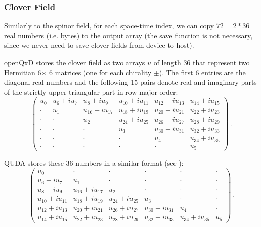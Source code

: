 \subsubsection{Clover Field}

Similarly to the spinor field, for each space-time index, we can copy $72 = 2*36$ real numbers (i.e.  bytes)
to the output array  (the save function is not necessary, since we never need to save clover fields from device to host).

openQxD stores the clover field as two arrays $u$ of length $36$ that represent two Hermitian 6$\times$ 6 matrices (one for each chirality $\pm$). The first $6$ entries are the diagonal real numbers and the following 15 pairs denote real and imaginary parts of the strictly upper triangular part in row-major order:
\newlength{\oldcolsep}
\setlength{\oldcolsep}{\arraycolsep}
\setlength{\arraycolsep}{4pt}
\begin{equation}
\begin{pmatrix}
u_0   & u_6 + iu_7 & u_8 + iu_9       & u_{10} + iu_{11} & u_{12} + iu_{13} & u_{14} + iu_{15} \\
\cdot & u_1        & u_{16} + iu_{17} & u_{18} + iu_{19} & u_{20} + iu_{21} & u_{22} + iu_{23} \\
\cdot & \cdot      & u_2              & u_{24} + iu_{25} & u_{26} + iu_{27} & u_{28} + iu_{29} \\
\cdot & \cdot      & \cdot            & u_3              & u_{30} + iu_{31} & u_{32} + iu_{33} \\
\cdot & \cdot      & \cdot            & \cdot            & u_4              & u_{34} + iu_{35} \\
\cdot & \cdot      & \cdot            & \cdot            & \cdot            & u_5
\end{pmatrix}\,.
\end{equation}

QUDA stores these 36 numbers in a similar format (see  \cite{QUDApaper}):
\begin{equation}
\begin{pmatrix}
u_0              & \cdot            & \cdot            & \cdot            & \cdot            & \cdot \\
u_6 + iu_7       & u_1              & \cdot            & \cdot            & \cdot            & \cdot \\
u_8 + iu_9       & u_{16} + iu_{17} & u_2              & \cdot            & \cdot            & \cdot \\
u_{10} + iu_{11} & u_{18} + iu_{19} & u_{24} + iu_{25} & u_3              & \cdot            & \cdot \\
u_{12} + iu_{13} & u_{20} + iu_{21} & u_{26} + iu_{27} & u_{30} + iu_{31} & u_4              & \cdot \\
u_{14} + iu_{15} & u_{22} + iu_{23} & u_{28} + iu_{29} & u_{32} + iu_{33} & u_{34} + iu_{35} & u_5
\end{pmatrix}\,. 
\end{equation}
\setlength{\arraycolsep}{\oldcolsep}

